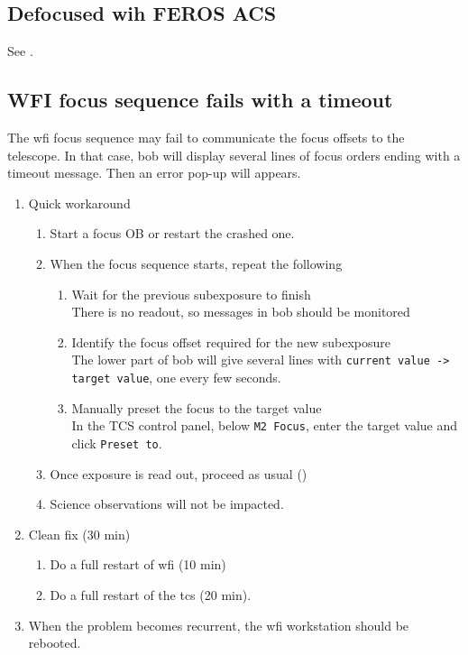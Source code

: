 \documentclass[11pt,fleqn,a4paper]{book}
\begin{document}
\subsection{Defocused wih FEROS ACS}

See .

\subsection{WFI focus sequence fails with a timeout}
\label{sec:wfifocseqtimeout}
The \gls{wfi} \gls{focus} sequence may fail to communicate the focus offsets to the telescope.  In that case, \gls{bob} will display several lines of focus orders ending with a timeout message. Then an error pop-up will appears.

\label{proc:wfifocseqtimeout}
\begin{enumerate}
    \item Quick workaround
    \begin{enumerate}
        \item Start a focus OB or restart the crashed one.
        \item When the focus sequence starts, repeat the following
        \begin{enumerate}
            \item Wait for the previous subexposure to finish\\
                  There is no readout, so messages in bob should be monitored
            \item Identify the focus offset required for the new subexposure\\
                  The lower part of \gls{bob} will give several lines with
                  \texttt{current value -> target value}, one every few seconds.
            \item Manually preset the focus to the target value\\ 
                  In the \gls{TCS control panel}, below \texttt{M2 Focus}, enter the target value and click \texttt{Preset to}.  
        \end{enumerate}
        \item Once exposure is read out, proceed as usual ()
        \item Science observations will not be impacted.
    \end{enumerate}
    \item Clean fix (30 min)
    \begin{enumerate}
        \item Do a full restart of \gls{wfi} (10 min)
        \item Do a full restart of the \gls{tcs} (20 min).
    \end{enumerate}
   \item When the problem becomes recurrent, the \gls{wfi} workstation should
be rebooted.
\end{enumerate}
\end{document}

